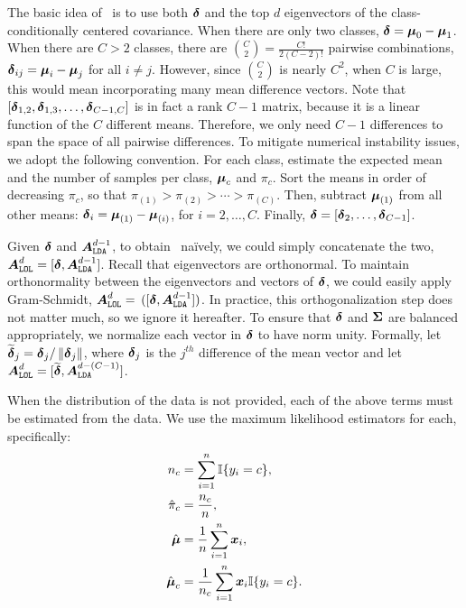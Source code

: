 \documentclass[11pt]{extarticle}
\begin{document}
The basic idea of \Lol~is to use both $\boldsymbol{\delta}$ and the top $d$ eigenvectors of the class-conditionally centered covariance.
When there are only two classes, $\boldsymbol{\delta}=\boldsymbol{\mu}_0-\boldsymbol{\mu}_1$.  When there are $C>2$ classes, there are $\binom{C}{2}=\frac{C!}{2 (C-2)!}$ pairwise combinations, $\boldsymbol{\delta}_{ij}=\boldsymbol{\mu}_i - \boldsymbol{\mu}_j$ for all $i\neq j$.   However, since $\binom{C}{2}$ is nearly $C^2$, when $C$ is large, this would mean incorporating many mean difference vectors.  Note that $[\boldsymbol{\delta}_{1,2}, \boldsymbol{\delta}_{1,3},\ldots, \boldsymbol{\delta}_{C-1,C}]$
is in fact a rank $C-1$ matrix, because it is a linear function of the $C$ different means. Therefore, we only need $C-1$ differences to span the space of all pairwise differences.  To mitigate numerical instability issues, we adopt the following convention.  For each class, estimate the expected mean and the number of samples per class, $\boldsymbol{\mu}_c$ and $\pi_c$.  Sort the means in order of decreasing $\pi_c$, so that $\pi_{(1)} > \pi_{(2)} > \cdots > \pi_{(C)}$.  Then, subtract $\boldsymbol{\mu}_{(1)}$ from all other means: $\boldsymbol{\delta}_i = \boldsymbol{\mu}_{(1)}-\boldsymbol{\mu}_{(i)}$, for $i=2,\ldots, C$.  Finally, $\boldsymbol{\delta}=[\boldsymbol{\delta}_2,\ldots, \boldsymbol{\delta}_{C-1}]$.

Given $\boldsymbol{\delta}$ and $\boldsymbol{A}_{{\texttt{LDA}}}^{d-1}$, to obtain \Lol~na\"ively, we could simply concatenate the two, $\boldsymbol{A}_{{\texttt{LOL}}}^d=[\boldsymbol{\delta},\boldsymbol{A}_{{\texttt{LDA}}}^{d-1}]$.
%
Recall that eigenvectors are orthonormal.  To maintain orthonormality between the eigenvectors and vectors of $\boldsymbol{\delta}$, we could easily apply Gram-Schmidt,  $\boldsymbol{A}_{{\texttt{LOL}}}^d=$ $([\boldsymbol{\delta}, \boldsymbol{A}_{{\texttt{LDA}}}^{d-1}])$.
In practice, this orthogonalization step does not matter much, so we ignore it hereafter.
To ensure that $\boldsymbol{\delta}$ and $\boldsymbol{\Sigma}$ are balanced appropriately, we normalize each vector in $\boldsymbol{\delta}$ to have norm unity.  Formally, let $\widetilde{\boldsymbol{\delta}}_j = \boldsymbol{\delta}_j / \left \lVert\boldsymbol{\delta}_j \right \rVert$, where $\boldsymbol{\delta}_j$ is the $j^{th}$ difference of the mean vector
 and let  $\boldsymbol{A}_{{\texttt{LOL}}}^d=[\widetilde{\boldsymbol{\delta}}, \boldsymbol{A}_{{\texttt{LDA}}}^{d-(C-1)}]$.

When the distribution of the data is not provided, each of the above terms must be estimated from the data.  We use the maximum likelihood estimators for each, specifically:
\begin{align}
n_c &= \sum_{i = 1}^n \mathbb{I}\{y_i = c\},\\
\hat{\pi}_c &= \frac{n_c}{n}, \\
\hat{\boldsymbol{\mu}} &= \frac{1}{n} \sum_{i=1}^n \boldsymbol{x}_i, \\
\hat{\boldsymbol{\mu}}_c &= \frac{1}{n_c} \sum_{i=1}^n \boldsymbol{x}_i \mathbb{I}\{y_i=c\}.
\end{align}
\end{document}
